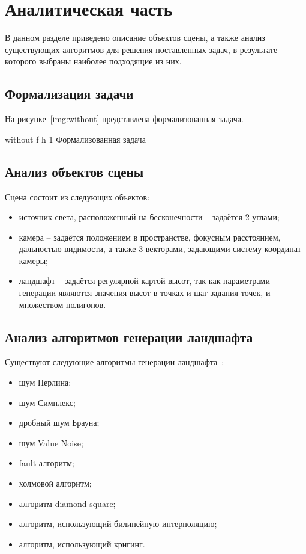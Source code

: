 \chapter{Аналитическая часть}

В данном разделе приведено описание объектов сцены, а также анализ существующих алгоритмов для решения поставленных задач, в результате которого выбраны наиболее подходящие из них.

\section{Формализация задачи}

На рисунке~\ref{img:without} представлена формализованная задача.

\FloatBarrier
{}
{without} %
{f} %
{h} %
{1\textwidth} %
{Формализованная задача} %
\FloatBarrier

\section{Анализ объектов сцены}

Сцена состоит из следующих объектов:

\begin{itemize}
	\item источник света, расположенный на бесконечности -- задаётся 2 углами;
	\item камера -- задаётся положением в пространстве, фокусным расстоянием, дальностью видимости, а также 3 векторами, задающими систему координат камеры;
	\item ландшафт -- задаётся регулярной картой высот, так как параметрами генерации являются значения высот в точках и шаг задания точек, и множеством полигонов.
\end{itemize}

\section{Анализ алгоритмов генерации ландшафта}

Существуют следующие алгоритмы генерации ландшафта~\cite{landscapes}\cite{noises}\cite{nohabrinsource}\cite{usages}\cite{Voronezh}\cite{criging}:

\begin{itemize}
	\item шум Перлина;
	\item шум Симплекс;
	\item дробный шум Брауна;
	\item шум Value Noise;
	\item fault алгоритм;
	\item холмовой алгоритм;
	\item алгоритм diamond-square;
	\item алгоритм, использующий билинейную интерполяцию;
	\item алгоритм, использующий кригинг.
\end{itemize}

